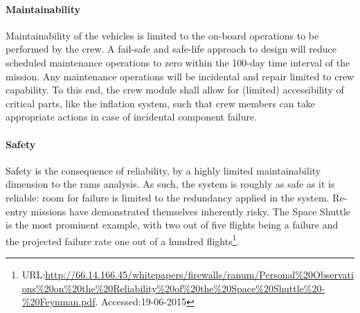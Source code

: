 \paragraph{Maintainability}
Maintainability of the vehicles is limited to the on-board operations to be performed by the crew. A fail-safe and safe-life approach to design will reduce scheduled maintenance operations to zero within the 100-day time interval of the mission. Any maintenance operations will be incidental and repair limited to crew capability. To this end, the crew module shall allow for (limited) accessibility of critical parts, like the inflation system, such that crew members can take appropriate actions in case of incidental component failure.

\paragraph{Safety}
Safety is the consequence of reliability, by a highly limited maintainability dimension to the \gls{rams} analysis. As such, the system is roughly as safe as it is reliable: room for failure is limited to the redundancy applied in the system. Re-entry missions have demonstrated themselves inherently risky. The Space Shuttle is the most prominent example, with two out of five flights being a failure and the projected failure rate one out of a hundred flights\footnote{URL:\url{http://66.14.166.45/whitepapers/firewalls/ranum/Personal\%20Observations\%20on\%20the\%20Reliability\%20of\%20the\%20Space\%20Shuttle\%20-\%20Feynman.pdf}. Accessed:19-06-2015}. 